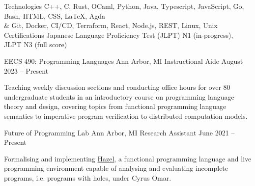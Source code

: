 \documentclass[letterpaper,11pt]{article}
\begin{document}
  \begin{rlinelist}
    \rline
      {Technologies}
      {C++, C, Rust, OCaml, Python, Java, Typescript, JavaScript, Go, Bash, HTML, CSS, \LaTeX, Agda \\
        & Git, Docker, CI/CD, Terraform, React, Node.js, REST, Linux, Unix}
    \rline
      {Certifications}
      {Japanese Language Proficiency Test (JLPT) N1 (in-progress), JLPT N3 (full score)}
  \end{rlinelist}

  \begin{rsectionlist}
    \rsectionitem
      {EECS 490: Programming Languages}
      {Ann Arbor, MI}
      {Instructional Aide}
      {August 2023 -- Present}

      Teaching weekly discussion sections and conducting office hours for over 80 undergraduate
      students in an introductory course on programming language theory and design, covering topics
      from functional programming language semantics to imperative program verification to
      distributed computation models.

    \rsectionitem
      {Future of Programming Lab}
      {Ann Arbor, MI}
      {Research Assistant}
      {June 2021 -- Present}
      
      Formalising and implementing \href{https://hazel.org}{Hazel}, a functional programming
      language and live programming environment capable of analysing and evaluating incomplete
      programs, i.e. programs with holes, under Cyrus Omar.

      \begin{rpointlist}
      \end{rpointlist}


\end{rsectionlist}
\end{document}
